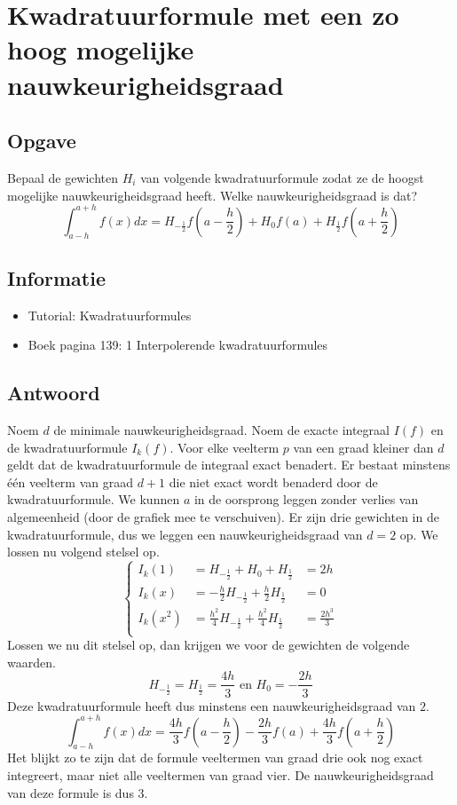 \documentclass[examenvragen.tex]{subfiles}
\begin{document}
\section{Kwadratuurformule met een zo hoog mogelijke nauwkeurigheidsgraad}
\subsection{Opgave}
Bepaal de gewichten $H_i$ van volgende kwadratuurformule zodat ze de hoogst mogelijke nauwkeurigheidsgraad heeft. Welke nauwkeurigheidsgraad is dat?
\[
\int_{a-h}^{a+h}f(x)dx = H_{-\frac{1}{2}}f\left(a-\frac{h}{2}\right) + H_0f(a) + H_\frac{1}{2}f\left(a+\frac{h}{2}\right)
\]

\subsection{Informatie}
\begin{itemize}
\item Tutorial: Kwadratuurformules
\item Boek pagina 139: 1 Interpolerende kwadratuurformules
\end{itemize}

\subsection{Antwoord}
Noem $d$ de minimale nauwkeurigheidsgraad. Noem de exacte integraal $I(f)$ en de kwadratuurformule $I_{k}(f)$.
Voor elke veelterm $p$ van een graad kleiner dan $d$ geldt dat de kwadratuurformule de integraal exact benadert.
Er bestaat minstens \'e\'en veelterm van graad $d+1$ die niet exact wordt benaderd door de kwadratuurformule. We kunnen $a$ in de oorsprong leggen zonder verlies van algemeenheid (door de grafiek mee te verschuiven). Er zijn drie gewichten in de kwadratuurformule, dus we leggen een nauwkeurigheidsgraad van $d=2$ op.
We lossen nu volgend stelsel op.
\[
\left\{
\begin{array}{ccl}
I_k(1) &= H_{-\frac{1}{2}} + H_0 + H_\frac{1}{2} &= 2h\\
I_k(x) &= -\frac{h}{2}H_{-\frac{1}{2}} + \frac{h}{2} H_\frac{1}{2} &= 0\\
I_k(x^2) &= \frac{h^2}{4}H_{-\frac{1}{2}} + \frac{h^2}{4} H_\frac{1}{2} &= \frac{2h^3}{3}\\
\end{array}
\right.
\]
Lossen we nu dit stelsel op, dan krijgen we voor de gewichten de volgende waarden.
\[
H_{-\frac{1}{2}} = H_\frac{1}{2} = \frac{4h}{3} \text{ en } H_0 = -\frac{2h}{3}
\]
Deze kwadratuurformule heeft dus minstens een nauwkeurigheidsgraad van $2$.
\[
\int_{a-h}^{a+h}f(x)dx =
\frac{4h}{3}f\left(a-\frac{h}{2}\right)- \frac{2h}{3}f(a) + \frac{4h}{3}f\left(a+\frac{h}{2}\right)
\]
Het blijkt zo te zijn dat de formule veeltermen van graad drie ook nog exact integreert, maar niet alle veeltermen van graad vier. De nauwkeurigheidsgraad van deze formule is dus $3$.
\end{document}
